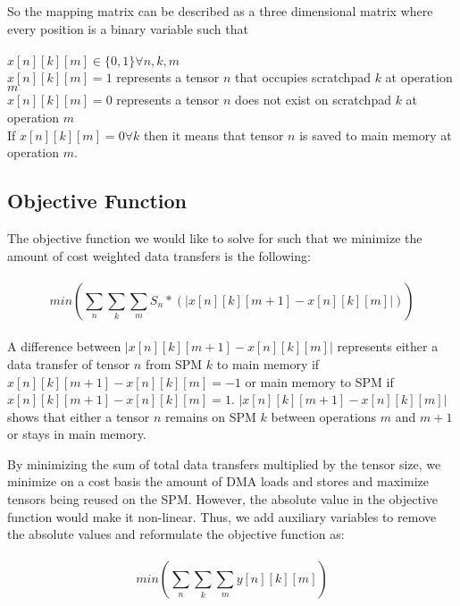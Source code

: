 So the mapping matrix can be described as a three dimensional matrix where every position is a binary variable such that\\
\\
$x[n][k][m] \in \{0, 1\} \forall n,k,m $\\
$x[n][k][m] = 1$ represents a tensor $n$ that occupies scratchpad $k$ at operation $m$ \\
$x[n][k][m] = 0$ represents a tensor $n$ does not exist on scratchpad $k$ at operation $m$\\

If $x[n][k][m] = 0 \forall k$ then it means that tensor $n$ is saved to main memory at operation $m$.


\subsection{Objective Function}
The objective function we would like to solve for such that we minimize the
amount of cost weighted data transfers is the following:\\
\\
\[
min(\sum_n \sum_k \sum_m S_n * (|x[n][k][m+1] - x[n][k][m]|))
\]
\\

A difference between $|x[n][k][m+1] - x[n][k][m]|$ represents either a data
transfer of tensor $n$ from SPM $k$ to main memory if $x[n][k][m+1] -
x[n][k][m] = -1$ or main memory to SPM if $x[n][k][m+1] - x[n][k][m] = 1$.
$|x[n][k][m+1] - x[n][k][m]|$ shows that either a tensor $n$ remains on SPM $k$
between operations $m$ and $m+1$ or stays in main memory.

By minimizing the sum of total data transfers multiplied by the tensor size, we
minimize on a cost basis the amount of DMA loads and stores and maximize
tensors being reused on the SPM. However, the absolute value in the objective function
would make it non-linear. Thus, we add auxiliary variables to remove the absolute values
and reformulate the objective function as:\\
\\
\[
min(\sum_n \sum_k \sum_m y[n][k][m])
\]

